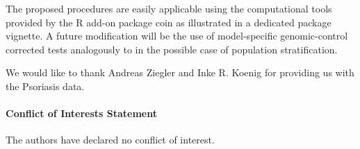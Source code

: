 \documentclass[bimj,fleqn]{w-art}
\newenvironment{coi}{\begin{small}\paragraph{Conflict of Interests Statement}}%
                    {\end{small}}
\newcommand{\Rpackage}[1]{{\normalfont\fontseries{b}\selectfont #1}}
\begin{document}
The proposed procedures are easily 
applicable using the computational tools provided by the \textsf{R} 
add-on package \Rpackage{coin} as illustrated in a dedicated package vignette. A future modification will be 
the use of model-specific genomic-control corrected tests 
analogously to \citet{Zang:2007} in the possible case of 
population stratification.

\begin{acknowledgement} 
We would like to thank Andreas Ziegler and Inke R. Koenig for providing 
us with the Psoriasis data.
\end{acknowledgement}

\begin{coi}
The authors have declared no conflict of interest.
\end{coi}




\end{document}
